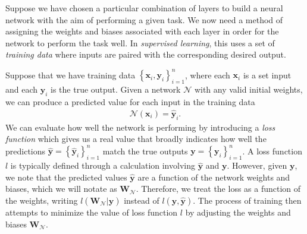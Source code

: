 \documentclass{somasmsc}
\begin{document}
Suppose we have chosen a particular combination of layers to build a neural network with the aim of performing a given task. We now need a method of assigning the weights and biases associated with each layer in order for the network to perform the task well. In \textit{supervised learning}, this uses a set of \textit{training data} where inputs are paired with the corresponding desired output.

Suppose that we have training data $\left\{\pmb{x}_i, \pmb{y}_i\right\}_{i=1}^n$, where each $\pmb{x}_i$ is a set input and each $\pmb{y}_i$ is the true output. Given a network $\mathcal{N}$ with any valid initial weights, we can produce a predicted value for each input in the training data
\begin{align*}
\mathcal{N}\left(\pmb{x}_i\right) = \hat{\pmb{y}}_i.
\end{align*}
We can evaluate how well the network is performing by introducing a \textit{loss function} which gives us a real value that broadly indicates how well the predictions $\hat{\pmb{y}} = \left\{\hat{\pmb{y}}_i\right\}_{i=1}^n$ match the true outputs $\pmb{y} = \left\{\pmb{y}_i\right\}_{i=1}^n$. A loss function $l$ is typically defined through a calculation involving $\hat{\pmb{y}}$ and $\pmb{y}$. However, given $\pmb{y}$, we note that the predicted values $\hat{\pmb{y}}$ are a function of the network weights and biases, which we will notate as $\mathbf{W}_{\mathcal{N}}$. Therefore, we treat the loss as a function of the weights, writing $l(\mathbf{W}_{\mathcal{N}} | \pmb{y})$ instead of $l(\pmb{y}, \hat{\pmb{y}})$. The process of training then attempts to minimize the value of loss function $l$ by adjusting the weights and biases $\mathbf{W}_{\mathcal{N}}$.
\end{document}
